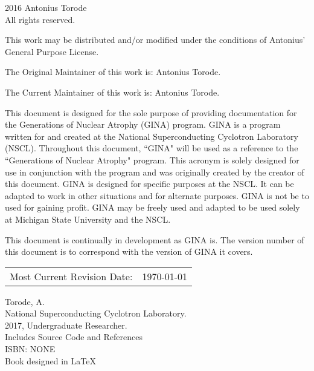 \pagestyle{empty}
\begingroup
\footnotesize
\parindent 0pt
\parskip \baselineskip
\textcopyright{} 2016 Antonius Torode \\
All rights reserved.

This work may be distributed and/or modified under the conditions of Antonius' General Purpose License.

The Original Maintainer of this work is: Antonius Torode.

The Current Maintainer of this work is: Antonius Torode.

This document is designed for the sole purpose of providing documentation for the Generations of Nuclear Atrophy (GINA) program. GINA is a program written for and created at the National Superconducting Cyclotron Laboratory (NSCL). Throughout this document, ``GINA" will be used as a reference to the ``Generations of Nuclear Atrophy" program. This acronym is solely designed for use in conjunction with the program and was originally created by the creator of this document. GINA is designed for specific purposes at the NSCL. It can be adapted to work in other situations and for alternate purposes. GINA is not be to used for gaining profit. GINA may be freely used and adapted to be used solely at Michigan State University and the NSCL.

This document is continually in development as GINA is. The version number of this document is to correspond with the version of GINA it covers.


\begin{center}
\begin{tabular}{ll}
Most Current Revision Date: &  \today 
\end{tabular}
\end{center}

\vfill

Torode, A.\\
\hspace*{2em} National Superconducting Cyclotron Laboratory. \\
\hspace*{2em} 2017, Undergraduate Researcher. \\
\hspace*{2em} Includes Source Code and References \\
\hspace*{2em} ISBN: NONE \\
\hspace*{2em} Book designed in \LaTeX



\endgroup
\clearpage